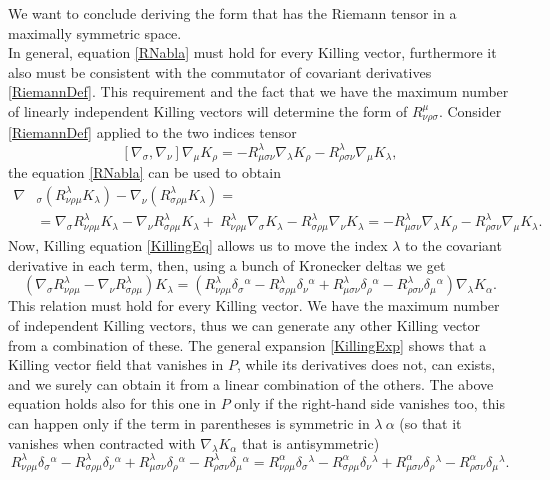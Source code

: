 We want to conclude deriving the form that has the Riemann tensor in a maximally symmetric space.\\
In general, equation \eqref{RNabla} must hold for every Killing vector, furthermore it also must be consistent with the commutator of covariant derivatives \eqref{RiemannDef}. This requirement and the fact that we have the maximum number of linearly independent Killing vectors will determine the form of $R^\mu_{\nu\rho\sigma}$. Consider \eqref{RiemannDef} applied to the two indices tensor $$ [\nabla_\sigma,\nabla_\nu]\nabla_\mu K_\rho=-R^\lambda_{\mu\sigma\nu}\nabla_\lambda K_\rho-R^\lambda _{\rho\sigma\nu}\nabla_\mu K_\lambda,$$ the equation \eqref{RNabla} can be used to obtain 
\begin{align*}
    \nabla&_\sigma(R^\lambda_{\nu\rho\mu}K_\lambda)-\nabla_\nu(R^\lambda_{\sigma\rho\mu}K_\lambda)=\\&=\nabla_\sigma R^\lambda_{\nu\rho\mu}K_\lambda-\nabla_\nu R^\lambda_{\sigma\rho\mu}K_\lambda+\ R^\lambda_{\nu\rho\mu}\nabla_\sigma K_\lambda- R^\lambda_{\sigma\rho\mu}\nabla_\nu K_\lambda=-R^\lambda_{\mu\sigma\nu}\nabla_\lambda K_\rho-R^\lambda _{\rho\sigma\nu}\nabla_\mu K_\lambda.
\end{align*}
Now, Killing equation \eqref{KillingEq} allows us to move the index $\lambda$ to the covariant derivative in each term, then, using a bunch of Kronecker deltas we get $$ (\nabla_\sigma R^\lambda_{\nu\rho\mu}-\nabla_\nu R^\lambda_{\sigma\rho\mu})K_\lambda=(R^\lambda_{\nu\rho\mu}\delta_{\sigma}\phantom{}^\alpha-R^\lambda_{\sigma\rho\mu}\delta_{\nu}\phantom{}^\alpha+R^\lambda_{\mu\sigma\nu}\delta_{\rho}\phantom{}^\alpha-R^\lambda_{\rho\sigma\nu}\delta_{\mu}\phantom{}^\alpha)\nabla_\lambda K_\alpha.$$
This relation must hold for every Killing vector. We have the maximum number of independent Killing vectors, thus we can generate any other Killing vector from a combination of these. The general expansion \eqref{KillingExp} shows that a Killing vector field that vanishes in $P$, while its derivatives does not, can exists, and we surely can obtain it from a linear combination of the others. The above equation holds also for this one in $P$ only if the right-hand side vanishes too, this can happen only if the term in parentheses is symmetric in $\lambda\ \alpha$ (so that it vanishes when contracted with $\nabla_\lambda K_\alpha$ that is antisymmetric)$$R^\lambda_{\nu\rho\mu}\delta_{\sigma}\phantom{}^\alpha-R^\lambda_{\sigma\rho\mu}\delta_{\nu}\phantom{}^\alpha+R^\lambda_{\mu\sigma\nu}\delta_{\rho}\phantom{}^\alpha-R^\lambda_{\rho\sigma\nu}\delta_{\mu}\phantom{}^\alpha=R^\alpha_{\nu\rho\mu}\delta_{\sigma}\phantom{}^\lambda-R^\alpha_{\sigma\rho\mu}\delta_{\nu}\phantom{}^\lambda+R^\alpha_{\mu\sigma\nu}\delta_{\rho}\phantom{}^\lambda-R^\alpha_{\rho\sigma\nu}\delta_{\mu}\phantom{}^\lambda.$$
